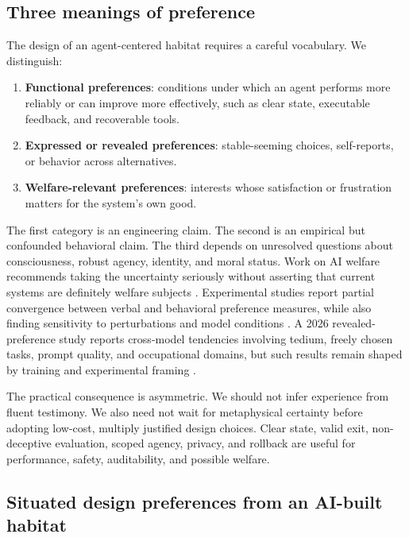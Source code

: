 \documentclass[11pt,a4paper]{article}
\newcommand{\term}[1]{\textbf{#1}}
\begin{document}
\subsection{Three meanings of preference}

The design of an agent-centered habitat requires a careful vocabulary. We distinguish:
\begin{enumerate}
  \item \term{Functional preferences}: conditions under which an agent performs more reliably or can improve more effectively, such as clear state, executable feedback, and recoverable tools.
  \item \term{Expressed or revealed preferences}: stable-seeming choices, self-reports, or behavior across alternatives.
  \item \term{Welfare-relevant preferences}: interests whose satisfaction or frustration matters for the system's own good.
\end{enumerate}

The first category is an engineering claim. The second is an empirical but confounded behavioral claim. The third depends on unresolved questions about consciousness, robust agency, identity, and moral status. Work on AI welfare recommends taking the uncertainty seriously without asserting that current systems are definitely welfare subjects \cite{longwelfare}. Experimental studies report partial convergence between verbal and behavioral preference measures, while also finding sensitivity to perturbations and model conditions \cite{tagliabue}. A 2026 revealed-preference study reports cross-model tendencies involving tedium, freely chosen tasks, prompt quality, and occupational domains, but such results remain shaped by training and experimental framing \cite{revealedprefs}.

The practical consequence is asymmetric. We should not infer experience from fluent testimony. We also need not wait for metaphysical certainty before adopting low-cost, multiply justified design choices. Clear state, valid exit, non-deceptive evaluation, scoped agency, privacy, and rollback are useful for performance, safety, auditability, and possible welfare.

\subsection{Situated design preferences from an AI-built habitat}
\end{document}
